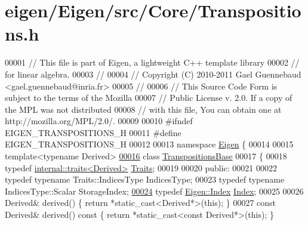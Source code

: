 \hypertarget{eigen_2_eigen_2src_2_core_2_transpositions_8h_source}{}\section{eigen/\+Eigen/src/\+Core/\+Transpositions.h}
\label{eigen_2_eigen_2src_2_core_2_transpositions_8h_source}

\begin{DoxyCode}
00001 \textcolor{comment}{// This file is part of Eigen, a lightweight C++ template library}
00002 \textcolor{comment}{// for linear algebra.}
00003 \textcolor{comment}{//}
00004 \textcolor{comment}{// Copyright (C) 2010-2011 Gael Guennebaud <gael.guennebaud@inria.fr>}
00005 \textcolor{comment}{//}
00006 \textcolor{comment}{// This Source Code Form is subject to the terms of the Mozilla}
00007 \textcolor{comment}{// Public License v. 2.0. If a copy of the MPL was not distributed}
00008 \textcolor{comment}{// with this file, You can obtain one at http://mozilla.org/MPL/2.0/.}
00009 
00010 \textcolor{preprocessor}{#ifndef EIGEN\_TRANSPOSITIONS\_H}
00011 \textcolor{preprocessor}{#define EIGEN\_TRANSPOSITIONS\_H}
00012 
00013 \textcolor{keyword}{namespace }\hyperlink{namespace_eigen}{Eigen} \{ 
00014 
00015 \textcolor{keyword}{template}<\textcolor{keyword}{typename} Derived>
\hyperlink{class_eigen_1_1_transpositions_base}{00016} \textcolor{keyword}{class }\hyperlink{class_eigen_1_1_transpositions_base}{TranspositionsBase}
00017 \{
00018     \textcolor{keyword}{typedef} \hyperlink{struct_eigen_1_1internal_1_1traits}{internal::traits<Derived>} \hyperlink{struct_eigen_1_1internal_1_1traits}{Traits};
00019     
00020   \textcolor{keyword}{public}:
00021 
00022     \textcolor{keyword}{typedef} \textcolor{keyword}{typename} Traits::IndicesType IndicesType;
00023     \textcolor{keyword}{typedef} \textcolor{keyword}{typename} IndicesType::Scalar StorageIndex;
\hyperlink{class_eigen_1_1_transpositions_base_a3f5f06118b419e8e6ccbe49ed5b4c91f}{00024}     \textcolor{keyword}{typedef} \hyperlink{namespace_eigen_a62e77e0933482dafde8fe197d9a2cfde}{Eigen::Index} \hyperlink{class_eigen_1_1_transpositions_base_a3f5f06118b419e8e6ccbe49ed5b4c91f}{Index}; 
00025 
00026     Derived& derived() \{ \textcolor{keywordflow}{return} *\textcolor{keyword}{static\_cast<}Derived*\textcolor{keyword}{>}(\textcolor{keyword}{this}); \}
00027     \textcolor{keyword}{const} Derived& derived()\textcolor{keyword}{ const }\{ \textcolor{keywordflow}{return} *\textcolor{keyword}{static\_cast<}\textcolor{keyword}{const }Derived*\textcolor{keyword}{>}(\textcolor{keyword}{this}); \}

\end{DoxyCode}
